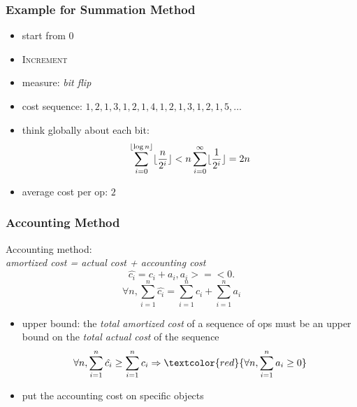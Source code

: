 \documentclass{beamer}
\DeclarePairedDelimiter\floor{\lfloor}{\rfloor}
\begin{document}
\begin{frame}
  \frametitle{Example for Summation Method}
  
  \begin{example}
    \begin{itemize}
      \item start from 0
	  \item \textsc{Increment}
	  \item measure: \emph{bit flip}
      \item cost sequence: $1,2,1,3,1,2,1,4,1,2,1,3,1,2,1,5,\ldots$
      \item think globally about each bit: 
        \[
          \sum_{i=0}^{\floor{\log n}} \floor{\frac{n}{2^i}} < n
          \sum_{i=0}^{\infty} \floor{\frac{1}{2^i}} = 2n
        \]
      \item average cost per op: $2$ 
    \end{itemize}
  \end{example}
\end{frame}

\begin{frame}
  \frametitle{Accounting Method}
  
  Accounting method: \\ 
  \emph{amortized cost = actual cost + accounting cost}
  \[
    \hat{c_i} = c_i + a_i, a_i >=< 0. 
  \]
  \[ 
    \forall n, \sum_{i=1}^{n} \hat{c_i} = \sum_{i=1}^{n} c_i + \sum_{i=1}^{n}
    a_i
  \]
  \begin{itemize}
    \item upper bound: the \emph{total amortized cost} of a sequence of ops must
    be an upper bound on the \emph{total actual cost} of the sequence
        \[ \forall n, \sum_{i=1}^{n} \hat{c_i} \geq \sum_{i=1}^{n} c_i
          \Rightarrow \textcolor{red}{\forall n, \sum_{i=1}^{n} a_i \geq 0} 
        \]
	\item put the accounting cost on specific objects 
  \end{itemize}
\end{frame}
\end{document}
